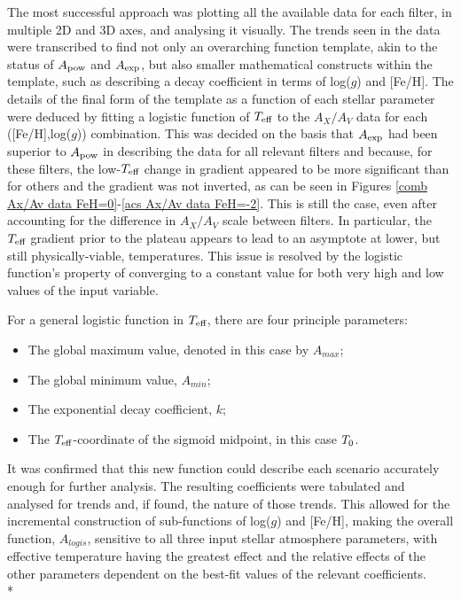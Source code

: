 \documentclass[12pt, a4paper]{report}
\begin{document}
The most successful approach was plotting all the available data for each filter, in multiple 2D and 3D axes, and analysing it visually. The trends seen in the data were transcribed to find not only an overarching function template, akin to the status of $A_{\textnormal{pow}}$ and $A_{\textnormal{exp}}$, but also smaller mathematical constructs within the template, such as describing a decay coefficient in terms of log($g$) and [Fe/H]. The details of the final form of the template as a function of each stellar parameter were deduced by fitting a logistic function of $T_{\textnormal{eff}}$ to the $A_{X}/A_{V}$ data for each ([Fe/H],log($g$)) combination. This was decided on the basis that $A_{\textnormal{exp}}$ had been superior to $A_{\textnormal{pow}}$ in describing the data for all relevant filters and because, for these filters, the low-$T_{\textnormal{eff}}$ change in gradient appeared to be more significant than for others and the gradient was not inverted, as can be seen in Figures \ref{comb Ax/Av data FeH=0}-\ref{acs Ax/Av data FeH=-2}. This is still the case, even after accounting for the difference in $A_{X}/A_{V}$ scale between filters. In particular, the $T_{\textnormal{eff}}$ gradient prior to the plateau appears to lead to an asymptote at lower, but still physically-viable, temperatures. This issue is resolved by the logistic function's property of converging to a constant value for both very high and low values of the input variable. 

For a general logistic function in $T_{\textnormal{eff}}$, there are four principle parameters:
\begin{itemize}
\item The global maximum value, denoted in this case by $A_{max}$;
\item The global minimum value, $A_{min}$;
\item The exponential decay coefficient, $k$;
\item The $T_{\textnormal{eff}}$-coordinate of the sigmoid midpoint, in this case $T_{\textnormal{0}}$.
\end{itemize}

It was confirmed that this new function could describe each scenario accurately enough for further analysis. The resulting coefficients were tabulated and analysed for trends and, if found, the nature of those trends. This allowed for the incremental construction of sub-functions of log($g$) and [Fe/H], making the overall function, $A_{logis}$, sensitive to all three input stellar atmosphere parameters, with effective temperature having the greatest effect and the relative effects of the other parameters dependent on the best-fit values of the relevant coefficients.\\*
\end{document}
